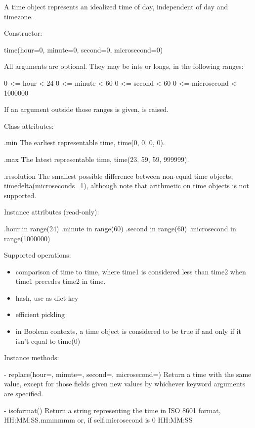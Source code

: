 A time object represents an idealized time of day, independent of day
and timezone.

Constructor:

    time(hour=0, minute=0, second=0, microsecond=0)

    All arguments are optional.  They may be ints or longs, in the
    following ranges:

        0 <= hour < 24
        0 <= minute < 60
        0 <= second < 60
        0 <= microsecond < 1000000

    If an argument outside those ranges is given,
     is raised.

Class attributes:

    .min
        The earliest representable time, time(0, 0, 0, 0).

    .max
        The latest representable time, time(23, 59, 59, 999999).

    .resolution
        The smallest possible difference between non-equal time
        objects, timedelta(microseconds=1), although note that
        arithmetic on time objects is not supported.

Instance attributes (read-only):

    .hour           in range(24)
    .minute         in range(60)
    .second         in range(60)
    .microsecond    in range(1000000)

Supported operations:

\begin{itemize}
  \item
    comparison of time to time, where time1 is considered
    less than time2 when time1 precedes time2 in time.

  \item
    hash, use as dict key

  \item
    efficient pickling

  \item
    in Boolean contexts, a time object is considered to be true
    if and only if it isn't equal to time(0)
\end{itemize}

Instance methods:

  - replace(hour=, minute=, second=, microsecond=)
    Return a time with the same value, except for those fields given
    new values by whichever keyword arguments are specified.

  - isoformat()
    Return a string representing the time in ISO 8601 format,
        HH:MM:SS.mmmmmm
    or, if self.microsecond is 0
        HH:MM:SS

